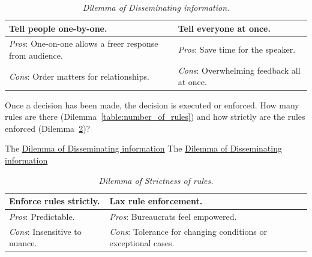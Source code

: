 \begin{center}
\begin{table}[H] %
\begin{tabular}{ | m{\dilemmatablewidth}| m{\dilemmatablewidth} | } 
  \hline
  \textbf{Tell people one-by-one.} & 
  \textbf{Tell everyone at once.} \\ 
  \hline
  \textit{Pros}: One-on-one allows a freer response from audience. &
  \textit{Pros}: Save time for the speaker. \\
  \hline
  \textit{Cons}: Order matters for relationships. & 
  \textit{Cons}: Overwhelming feedback all at once. \\  
  \hline
\end{tabular}
\caption{
\textit{Dilemma of Disseminating information.}
}
\label{table:disseminate_one-by-one}
\end{table}
\end{center}

Once a decision has been made, the decision is executed or enforced. How many rules are there (Dilemma~\ref{table:number_of_rules}) and
how strictly are the rules enforced (Dilemma~\ref{table:rule_strictness})?

The \href{table:disseminate_one-by-one}{Dilemma of Disseminating information}
The \href{table:disseminate_one-by-one}{Dilemma of Disseminating information}


\begin{center}
\begin{table}[H] %
\begin{tabular}{ | m{\dilemmatablewidth}| m{\dilemmatablewidth} | } 
  \hline
  \textbf{Enforce rules strictly.} & 
  \textbf{Lax rule enforcement.} \\ 
  \hline
  \textit{Pros}: Predictable. &
  \textit{Pros}: Bureaucrats feel empowered. \\
  \hline
  \textit{Cons}: Insensitive to nuance. & 
  \textit{Cons}: Tolerance for changing conditions or exceptional cases.  \\  
  \hline
\end{tabular}
\caption{
\textit{Dilemma of Strictness of rules.}
}
\label{table:rule_strictness}
\end{table}
\end{center}

